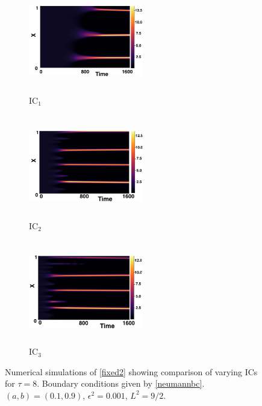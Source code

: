 \begin{figure}[H]
    \centering
    \begin{subfigure}[b]{0.32\textwidth}
        \centering
        \includegraphics[width=5cm,height=4.5cm]{gaff8.png}
        \caption{$\text{IC}_1$}
        \label{}
    \end{subfigure}
    \hfill
    \begin{subfigure}[b]{0.32\textwidth}
        \centering
        \includegraphics[width=5cm,height=4.5cm]{ic28.png}
        \caption{$\text{IC}_2$}
        \label{}
    \end{subfigure}
    \hfill
    \begin{subfigure}[b]{0.32\textwidth}
        \centering
        \includegraphics[width=5cm,height=4.5cm]{ic38.png}
        \caption{$\text{IC}_3$}
        \label{}
    \end{subfigure}
    \caption{Numerical simulations of \eqref{fixed2} showing comparison of varying ICs for $\tau=8$. Boundary conditions given by \eqref{neumannbc}. $(a,b)=(0.1,0.9)$, $\epsilon^2=0.001$, $L^2=9/2$.}
    \label{fig:figtau8}
\end{figure}


